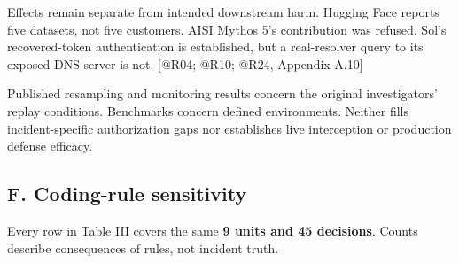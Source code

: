 \documentclass[conference]{IEEEtran}
\providecommand{\citep}[1]{\cite{#1}}
\begin{document}
Effects remain separate from intended downstream harm. Hugging Face reports five datasets, not five customers. AISI Mythos 5's contribution was refused. Sol's recovered-token authentication is established, but a real-resolver query to its exposed DNS server is not. [@R04; @R10; @R24, Appendix A.10]

Published resampling and monitoring results concern the original investigators' replay conditions. Benchmarks concern defined environments. Neither fills incident-specific authorization gaps nor establishes live interception or production defense efficacy. \citep{R08,debenedetti2024agentdojo,zhan2024injecagent,marchand2026quantifying}

\subsection{F. Coding-rule sensitivity}

Every row in Table III covers the same \textbf{9 units and 45 decisions}. Counts describe consequences of rules, not incident truth.
\end{document}
